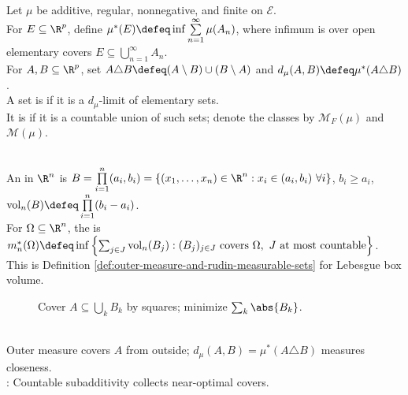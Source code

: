 \begin{definition} \label{def:outer-measure-and-rudin-measurable-sets} \\
Let $\mu$ be additive, regular, nonnegative, and finite on $\mathcal{E}$.\\
For $E\subseteq\R^p$, define $\mu^\ast(E)\defeq\inf\sum\limits_{n=1}^{\infty}\mu(A_n)$, where infimum is over open elementary covers $E\subseteq\bigcup\limits_{n=1}^{\infty}A_n$.\\
For $A,B\subseteq\R^p$, set $A\triangle B\defeq(A\setminus B)\cup(B\setminus A)$ and $d_\mu(A,B)\defeq\mu^\ast(A\triangle B)$.\\
A set is  if it is a $d_\mu$-limit of elementary sets.\\
It is  if it is a countable union of such sets; denote the classes by $\mathcal{M}_F(\mu)$ and $\mathcal{M}(\mu)$.
\end{definition}

\begin{definition} \label{def:tao-box-cover-outer-measure} \\
An  in $\R^n$ is $B=\prod\limits_{i=1}^{n}(a_i,b_i)=\{(x_1,\ldots,x_n)\in\R^n:x_i\in(a_i,b_i) \ \forall i \}$, $b_i\geq a_i$, $\operatorname{vol}_n(B)\defeq\prod\limits_{i=1}^{n}(b_i-a_i)$.\\
For $\Omega\subseteq\R^n$, the  is $m_n^\ast(\Omega)\defeq\inf\left\{\sum_{j\in J}\operatorname{vol}_n(B_j):(B_j)_{j\in J}\text{ covers }\Omega,\ J\text{ at most countable}\right\}$.\\
This is Definition \ref{def:outer-measure-and-rudin-measurable-sets} for Lebesgue box volume.
\end{definition}

\begin{figure}[H]
  \centering
  
  \caption{Cover $A\subseteq\bigcup_k B_k$ by squares; minimize $\sum_k\abs{B_k}$.}
  \label{fig:outer-measure-rectangle-cover}
\end{figure}

\begin{perspective} \label{per:outer-measure-geometric-box-covers} \\
Outer measure covers $A$ from outside; $d_\mu(A,B)=\mu^\ast(A\triangle B)$ measures closeness.\\
: Countable subadditivity collects near-optimal covers.
\end{perspective}

